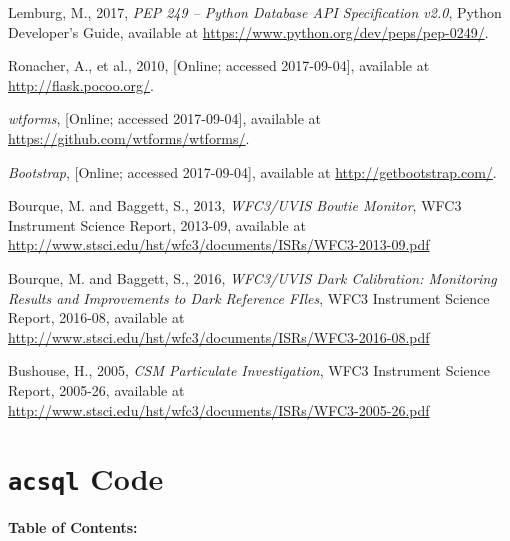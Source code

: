 \documentclass[10pt,journal,compsoc]{IEEEtran}
\begin{document}
\begin{thebibliography}{1}
Lemburg, M., 2017, \emph{PEP 249 -- Python Database API Specification v2.0}, Python Developer's Guide,
available at \textcolor{blue}{\url{https://www.python.org/dev/peps/pep-0249/}}.

Ronacher, A., et al., 2010, [Online; accessed 2017-09-04], available at \textcolor{blue}{\url{http://flask.pocoo.org/}}.

\emph{wtforms}, [Online; accessed 2017-09-04], available at \textcolor{blue}{\url{https://github.com/wtforms/wtforms/}}.

\emph{Bootstrap}, [Online; accessed 2017-09-04], available at \textcolor{blue}{\url{http://getbootstrap.com/}}.

Bourque, M. and Baggett, S., 2013, \emph{WFC3/UVIS Bowtie Monitor}, WFC3 Instrument Science Report, 2013-09,
available at \textcolor{blue}{\url{http://www.stsci.edu/hst/wfc3/documents/ISRs/WFC3-2013-09.pdf}}

Bourque, M. and Baggett, S., 2016, \emph{WFC3/UVIS Dark Calibration: Monitoring Results and Improvements to Dark Reference FIles},
WFC3 Instrument Science Report, 2016-08, available at \textcolor{blue}{\url{http://www.stsci.edu/hst/wfc3/documents/ISRs/WFC3-2016-08.pdf}}

Bushouse, H., 2005, \emph{CSM Particulate Investigation}, WFC3 Instrument Science Report, 2005-26, available
at \textcolor{blue}{\url{http://www.stsci.edu/hst/wfc3/documents/ISRs/WFC3-2005-26.pdf}}

\end{thebibliography}

\onecolumn
\newpage
\appendices
\section{\texttt{acsql} Code}

\bigskip\textbf{Table of Contents:}\bigskip
\end{document}
